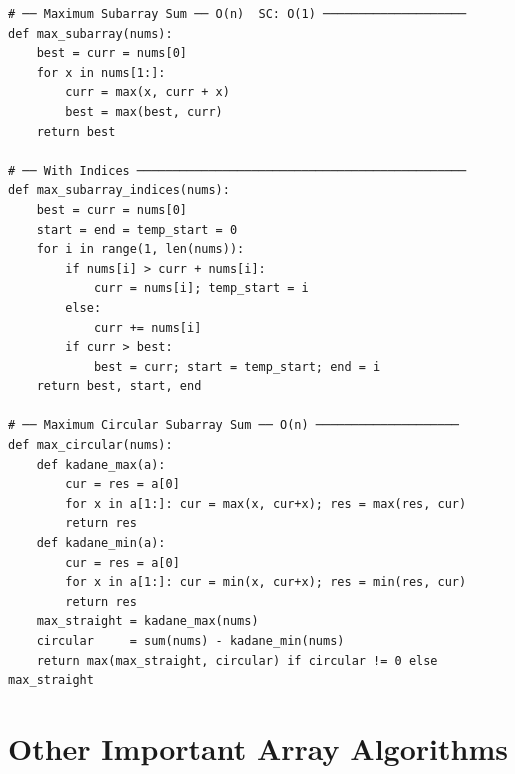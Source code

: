 \documentclass[11pt,a4paper]{report}
\begin{document}
\begin{lstlisting}
# ── Maximum Subarray Sum ── O(n)  SC: O(1) ────────────────────
def max_subarray(nums):
    best = curr = nums[0]
    for x in nums[1:]:
        curr = max(x, curr + x)
        best = max(best, curr)
    return best

# ── With Indices ──────────────────────────────────────────────
def max_subarray_indices(nums):
    best = curr = nums[0]
    start = end = temp_start = 0
    for i in range(1, len(nums)):
        if nums[i] > curr + nums[i]:
            curr = nums[i]; temp_start = i
        else:
            curr += nums[i]
        if curr > best:
            best = curr; start = temp_start; end = i
    return best, start, end

# ── Maximum Circular Subarray Sum ── O(n) ────────────────────
def max_circular(nums):
    def kadane_max(a):
        cur = res = a[0]
        for x in a[1:]: cur = max(x, cur+x); res = max(res, cur)
        return res
    def kadane_min(a):
        cur = res = a[0]
        for x in a[1:]: cur = min(x, cur+x); res = min(res, cur)
        return res
    max_straight = kadane_max(nums)
    circular     = sum(nums) - kadane_min(nums)
    return max(max_straight, circular) if circular != 0 else max_straight
\end{lstlisting}

\section{Other Important Array Algorithms}
\end{document}
